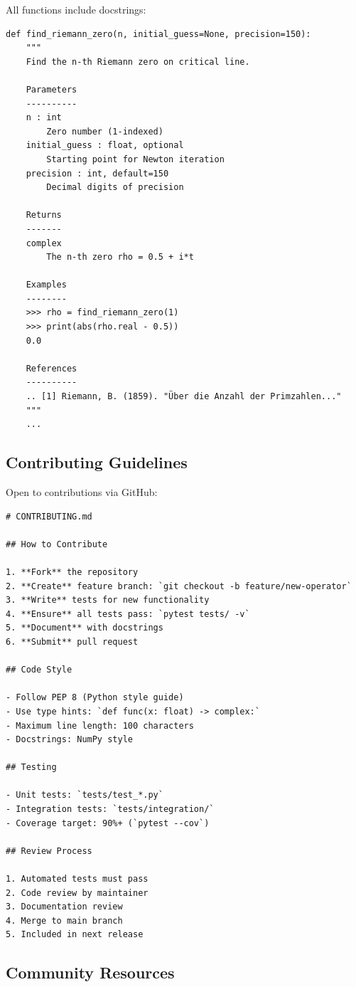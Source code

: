 All functions include docstrings:
\begin{verbatim}
def find_riemann_zero(n, initial_guess=None, precision=150):
    """
    Find the n-th Riemann zero on critical line.

    Parameters
    ----------
    n : int
        Zero number (1-indexed)
    initial_guess : float, optional
        Starting point for Newton iteration
    precision : int, default=150
        Decimal digits of precision

    Returns
    -------
    complex
        The n-th zero rho = 0.5 + i*t

    Examples
    --------
    >>> rho = find_riemann_zero(1)
    >>> print(abs(rho.real - 0.5))
    0.0

    References
    ----------
    .. [1] Riemann, B. (1859). "Über die Anzahl der Primzahlen..."
    """
    ...
\end{verbatim}

\subsection{Contributing Guidelines}

Open to contributions via GitHub:

\begin{verbatim}
# CONTRIBUTING.md

## How to Contribute

1. **Fork** the repository
2. **Create** feature branch: `git checkout -b feature/new-operator`
3. **Write** tests for new functionality
4. **Ensure** all tests pass: `pytest tests/ -v`
5. **Document** with docstrings
6. **Submit** pull request

## Code Style

- Follow PEP 8 (Python style guide)
- Use type hints: `def func(x: float) -> complex:`
- Maximum line length: 100 characters
- Docstrings: NumPy style

## Testing

- Unit tests: `tests/test_*.py`
- Integration tests: `tests/integration/`
- Coverage target: 90%+ (`pytest --cov`)

## Review Process

1. Automated tests must pass
2. Code review by maintainer
3. Documentation review
4. Merge to main branch
5. Included in next release
\end{verbatim}

\subsection{Community Resources}

